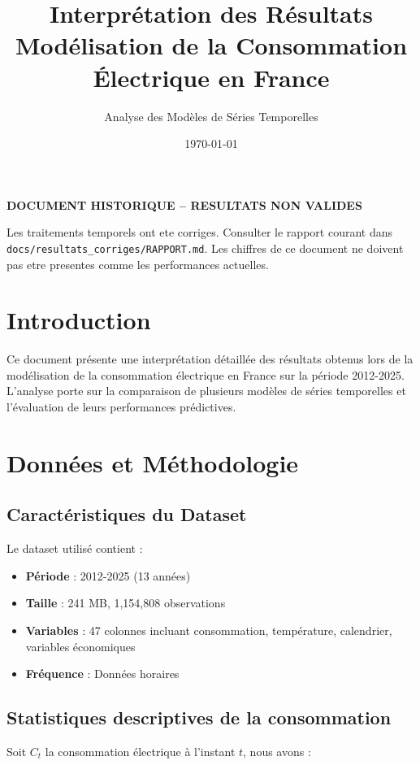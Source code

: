 \documentclass[12pt,a4paper]{article}
\title{\textbf{Interprétation des Résultats\\Modélisation de la Consommation Électrique en France}}
\author{Analyse des Modèles de Séries Temporelles}
\date{\today}
\begin{document}
\begin{center}\textbf{DOCUMENT HISTORIQUE -- RESULTATS NON VALIDES}\end{center}
Les traitements temporels ont ete corriges. Consulter le rapport courant dans \texttt{docs/resultats\_corriges/RAPPORT.md}. Les chiffres de ce document ne doivent pas etre presentes comme les performances actuelles.


\maketitle

\section{Introduction}

Ce document présente une interprétation détaillée des résultats obtenus lors de la modélisation de la consommation électrique en France sur la période 2012-2025. L'analyse porte sur la comparaison de plusieurs modèles de séries temporelles et l'évaluation de leurs performances prédictives.

\section{Données et Méthodologie}

\subsection{Caractéristiques du Dataset}

Le dataset utilisé contient :
\begin{itemize}
    \item \textbf{Période} : 2012-2025 (13 années)
    \item \textbf{Taille} : 241 MB, 1,154,808 observations
    \item \textbf{Variables} : 47 colonnes incluant consommation, température, calendrier, variables économiques
    \item \textbf{Fréquence} : Données horaires
\end{itemize}

\subsection{Statistiques descriptives de la consommation}

Soit $C_t$ la consommation électrique à l'instant $t$, nous avons :
\end{document}
